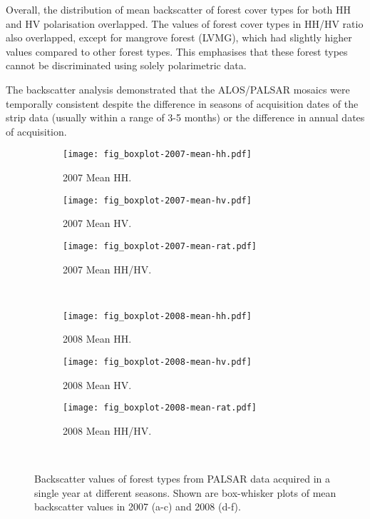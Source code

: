 Overall, the distribution of mean backscatter of forest cover types for both HH and HV polarisation overlapped. The values of forest cover types in HH/HV ratio also overlapped, except for mangrove forest (LVMG), which had slightly higher values compared to other forest types. This emphasises that these forest types cannot be discriminated using solely polarimetric data.

The backscatter analysis demonstrated that the ALOS/PALSAR mosaics were temporally consistent despite the difference in seasons of acquisition dates of the strip data (usually within a range of 3-5 months) or the difference in annual dates of acquisition.

\begin{landscape}
\begin{figure}[!ht] \centering
	\captionsetup[subfigure]{width=2.0in} %
	\begin{subfigure}[t]{0.43\textwidth}
		\texttt{[image: fig\_boxplot-2007-mean-hh.pdf]}
		\caption[Single year backscatter boxplots.]{2007 Mean HH.}
		\label{fig: result-box4.1a}
	\end{subfigure}
	\begin{subfigure}[t]{0.43\textwidth}
		\texttt{[image: fig\_boxplot-2007-mean-hv.pdf]}
		\caption[Single year backscatter boxplots.]{2007 Mean HV.}
		\label{fig: result-box4.1b}
	\end{subfigure}
	\begin{subfigure}[t]{0.43\textwidth}
		\texttt{[image: fig\_boxplot-2007-mean-rat.pdf]}
		\caption[Single year backscatter boxplots.]{2007 Mean HH/HV.}
		\label{fig: result-box4.1c}
	\end{subfigure}\\
	\vspace{20pt}
	\begin{subfigure}[t]{0.43\textwidth}
		\texttt{[image: fig\_boxplot-2008-mean-hh.pdf]}
		\caption[Single year backscatter boxplots.]{2008 Mean HH.}
		\label{fig: result-box4.1d}
	\end{subfigure}
	\begin{subfigure}[t]{0.43\textwidth}
		\texttt{[image: fig\_boxplot-2008-mean-hv.pdf]}
		\caption[Single year backscatter boxplots.]{2008 Mean HV.}
		\label{fig: result-box4.1e}
	\end{subfigure}
	\begin{subfigure}[t]{0.43\textwidth}
		\texttt{[image: fig\_boxplot-2008-mean-rat.pdf]}
		\caption[Single year backscatter boxplots.]{2008 Mean HH/HV.}
		\label{fig: result-box4.1f}
	\end{subfigure}\\
	\vspace{20pt}
	\caption[Backscatter values of forest types from PALSAR data acquired in a single year at different seasons.]{Backscatter values of forest types from PALSAR data acquired in a single year at different seasons. Shown are box-whisker plots of mean backscatter values in 2007 (a-c) and 2008 (d-f).}
	\label{fig: result-box4.1}
\end{figure}
\end{landscape}

